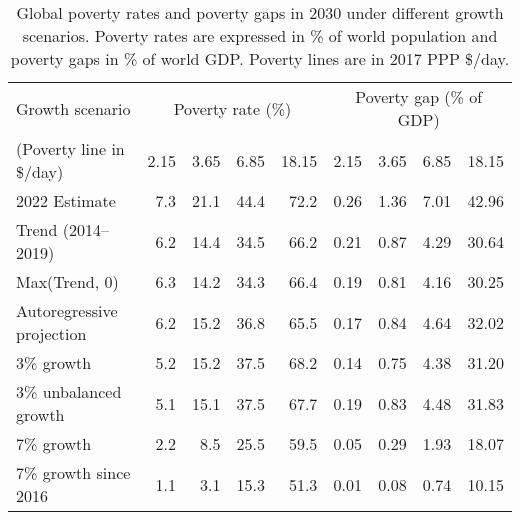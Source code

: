 \begin{table}[h]

\caption[Global poverty (rates and gaps) in 2030 under different growth scenarios.]{\label{tab:poverty}Global poverty rates and poverty gaps in 2030 under different growth scenarios. Poverty rates are expressed in \% of world population and poverty gaps in \% of world GDP. Poverty lines are in 2017 PPP \$/day.}
\centering
\begin{tabular}[t]{lrrrrrrrr}
\toprule Growth scenario & \multicolumn{4}{c}{Poverty rate (\%)} & \multicolumn{4}{c}{Poverty gap (\% of GDP)} \\ 
 (Poverty line in \$/day)  & 2.15 & 3.65 & 6.85 & 18.15 & 2.15 & 3.65 & 6.85 & 18.15\\
\midrule
2022 Estimate & 7.3 & 21.1 & 44.4 & 72.2 & 0.26 & 1.36 & 7.01 & 42.96\\
Trend (2014--2019) & 6.2 & 14.4 & 34.5 & 66.2 & 0.21 & 0.87 & 4.29 & 30.64\\
Max(Trend, 0) & 6.3 & 14.2 & 34.3 & 66.4 & 0.19 & 0.81 & 4.16 & 30.25\\
Autoregressive projection & 6.2 & 15.2 & 36.8 & 65.5 & 0.17 & 0.84 & 4.64 & 32.02\\
3\% growth & 5.2 & 15.2 & 37.5 & 68.2 & 0.14 & 0.75 & 4.38 & 31.20\\
3\% unbalanced growth & 5.1 & 15.1 & 37.5 & 67.7 & 0.19 & 0.83 & 4.48 & 31.83\\
7\% growth & 2.2 & 8.5 & 25.5 & 59.5 & 0.05 & 0.29 & 1.93 & 18.07\\
7\% growth since 2016 & 1.1 & 3.1 & 15.3 & 51.3 & 0.01 & 0.08 & 0.74 & 10.15\\
\bottomrule
\end{tabular}
\end{table}